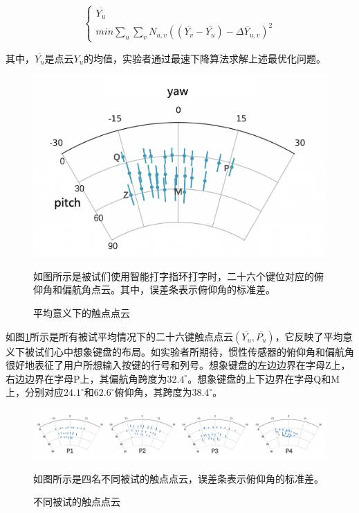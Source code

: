 \begin{equation}
\begin{cases}
\overline{Y_u} \\
min \sum_{u}\sum_{v}N_{u,v}((\overline{Y_v}-\overline{Y_u})-\overline{\Delta{Y}_{u,v}})^2
\end{cases}
\end{equation}

其中，$\overline{Y_u}$是点云$Y_u$的均值，实验者通过最速下降算法求解上述最优化问题。

\begin{figure}[!htbp]
	\centering
	\includegraphics[width=0.8\linewidth]{figures/QwertyRing_point_cloud.jpg}
	\caption*{如图所示是被试们使用智能打字指环打字时，二十六个键位对应的俯仰角和偏航角点云。其中，误差条表示俯仰角的标准差。}
	\caption{平均意义下的触点点云}
	\label{fig:QwertyRing_point_cloud}
\end{figure}

如图\ref{fig:QwertyRing_point_cloud}所示是所有被试平均情况下的二十六键触点点云$(\overline{Y_u},\overline{P_u})$，它反映了平均意义下被试们心中想象键盘的布局。如实验者所期待，惯性传感器的俯仰角和偏航角很好地表征了用户所想输入按键的行号和列号。想象键盘的左边边界在字母Z上，右边边界在字母P上，其偏航角跨度为$32.4^\circ$。想象键盘的上下边界在字母Q和M上，分别对应$24.1^\circ$和$62.6^\circ$俯仰角，其跨度为$38.4^\circ$。

\begin{figure}[!htbp]
	\centering
	\includegraphics[width=1.0\linewidth]{figures/QwertyRing_pc_over_people.png}
	\caption*{如图所示是四名不同被试的触点点云，误差条表示俯仰角的标准差。}
	\caption{不同被试的触点点云}
	\label{fig:QwertyRing_pc_over_people}
\end{figure}

